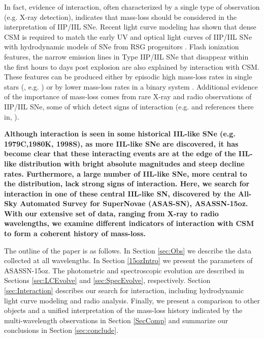 \documentclass[a4paper,fleqn,usenatbib]{mnras}
\begin{document}
In fact, evidence of interaction, often characterized by a single type of observation (e.g. X-ray detection), indicates that mass-loss should be considered in the interpretation of IIP/IIL SNe.
Recent light curve modeling has shown that dense CSM is required to match the early UV and optical light curves of IIP/IIL SNe with hydrodynamic models of SNe from RSG progenitors \citep{2015gezari,2018morozova,2018paxton,2018foerster}.  
Flash ionization features, the narrow emission lines in Type IIP/IIL SNe that disappear within the first hours to days post explosion are also explained by interaction with CSM. 
These features can be produced either by episodic high mass-loss rates in single stars (\citealt{2014gal-yam}, e.g. \citealt{ 2017yaron}) or by lower mass-loss rates in a binary system \citep{2018kochanek}.
Additional evidence of the importance of mass-loss comes from rare X-ray and radio observations of IIP/IIL SNe, some of which detect signs of interaction (e.g. \citealt{2014dwarkadas} and references there in, \citealt{2018morozova2}).

\textbf{Although interaction is seen in some historical IIL-like SNe (e.g. 1979C,1980K, 1998S), as more IIL-like SNe are discovered, it has become clear that these interacting events are at the edge of the IIL-like distribution with bright absolute magnitudes and steep decline rates. 
Furthermore, a large number of IIL-like SNe, more central to the distribution, lack strong signs of interaction.
Here, we search for interaction in one of these central IIL-like SN, discovered by the All-Sky Automated Survey for SuperNovae (ASAS-SN), ASASSN-15oz.
With our extensive set of data, ranging from X-ray to radio wavelengths, we examine different indicators of interaction with CSM to form a coherent history of mass-loss.}

The outline of the paper is as follows.
In Section \ref{sec:Obs} we describe the data collected at all wavelengths.
In Section \ref{15ozIntro} we present the parameters of ASASSN-15oz.
The photometric and spectroscopic evolution are described in Sections \ref{sec:LCEvolve} and \ref{sec:SpecEvolve}, respectively.
Section \ref{sec:Interaction} describes our search for interaction, including hydrodynamic light curve modeling and radio analysis.
Finally, we present a comparison to other objects and a unified interpretation of the mass-loss history indicated by the multi-wavelength observations  in Section \ref{SecComp} and summarize our conclusions in Section \ref{sec:conclude}.
\end{document}
